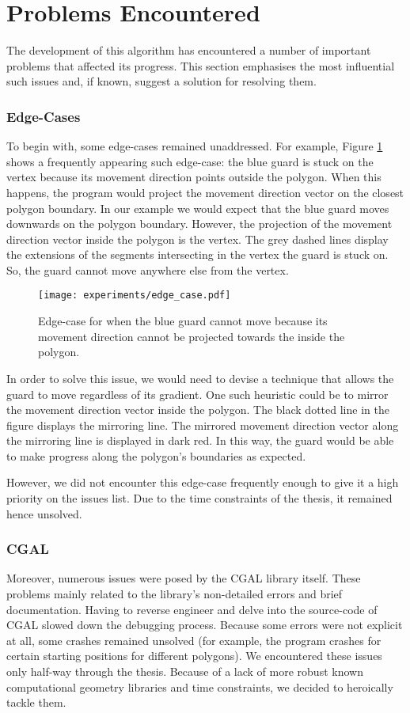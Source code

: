 \section{Problems Encountered}
\label{sec:problems}
The development of this algorithm has encountered a number of important problems that affected its progress. This section emphasises the most influential such issues and, if known, suggest a solution for resolving them.

\subsubsection*{Edge-Cases}
To begin with, some edge-cases remained unaddressed. For example, Figure \ref{fig:edge} shows a frequently appearing such edge-case: the blue guard is stuck on the vertex because its movement direction points outside the polygon.
When this happens, the program would project the movement direction vector on the closest polygon boundary. In our example we would expect that the blue guard moves downwards on the polygon boundary. However, the projection of the movement direction vector inside the polygon is the vertex. The grey dashed lines display the extensions of the segments intersecting in the vertex the guard is stuck on. So, the guard cannot move anywhere else from the vertex.

\begin{figure}[h!]
    \centering
    \texttt{[image: experiments/edge\_case.pdf]}
    \caption{Edge-case for when the blue guard cannot move because its movement direction cannot be projected towards the inside the polygon.}
    \label{fig:edge}
\end{figure}

In order to solve this issue, we would need to devise a technique that allows the guard to move regardless of its gradient. One such heuristic could be to mirror the movement direction vector inside the polygon. The black dotted line in the figure displays the mirroring line. The mirrored movement direction vector along the mirroring line is displayed in dark red. In this way, the guard would be able to make progress along the polygon's boundaries as expected.

However, we did not encounter this edge-case frequently enough to give it a high priority on the issues list. Due to the time constraints of the thesis, it remained hence unsolved.

\subsubsection*{CGAL}
Moreover, numerous issues were posed by the CGAL library itself. These problems mainly related to the library's non-detailed errors and brief documentation. Having to reverse engineer and delve into the source-code of CGAL slowed down the debugging process. Because some errors were not explicit at all, some crashes remained unsolved (for example, the program crashes for certain starting positions for different polygons). We encountered these issues only half-way through the thesis. Because of a lack of more robust known computational geometry libraries and time constraints, we decided to heroically tackle them.

